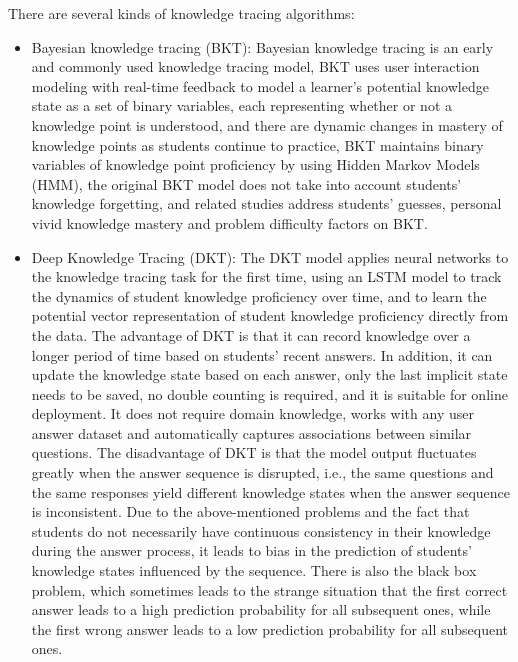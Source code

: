 There are several kinds of knowledge tracing algorithms:
\begin{itemize}
	\item Bayesian knowledge tracing (BKT): Bayesian knowledge tracing is an early and commonly used knowledge tracing model, BKT uses user interaction modeling with real-time feedback to model a learner's potential knowledge state as a set of binary variables, each representing whether or not a knowledge point is understood, and there are dynamic changes in mastery of knowledge points as students continue to practice, BKT maintains binary variables of knowledge point proficiency by using Hidden Markov Models (HMM), the original BKT model does not take into account students' knowledge forgetting, and related studies address students' guesses, personal vivid knowledge mastery and problem difficulty factors on BKT\cite{yudelson2013individualized}.
	\item Deep Knowledge Tracing (DKT): The DKT model applies neural networks to the knowledge tracing task for the first time\cite{piech2015deep}, using an LSTM model to track the dynamics of student knowledge proficiency over time, and to learn the potential vector representation of student knowledge proficiency directly from the data. The advantage of DKT is that it can record knowledge over a longer period of time based on students' recent answers. In addition, it can update the knowledge state based on each answer, only the last implicit state needs to be saved, no double counting is required, and it is suitable for online deployment. It does not require domain knowledge, works with any user answer dataset and automatically captures associations between similar questions. The disadvantage of DKT is that the model output fluctuates greatly when the answer sequence is disrupted, i.e., the same questions and the same responses yield different knowledge states when the answer sequence is inconsistent. Due to the above-mentioned problems and the fact that students do not necessarily have continuous consistency in their knowledge during the answer process, it leads to bias in the prediction of students' knowledge states influenced by the sequence. There is also the black box problem, which sometimes leads to the strange situation that the first correct answer leads to a high prediction probability for all subsequent ones, while the first wrong answer leads to a low prediction probability for all subsequent ones.

\end{itemize}
